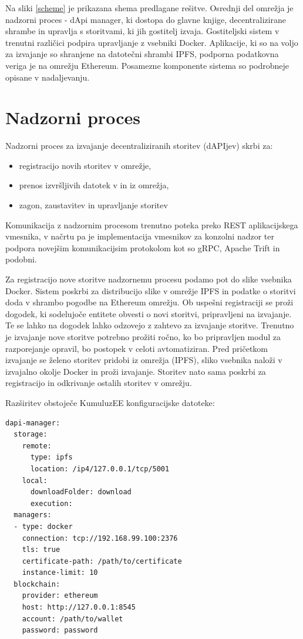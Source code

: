\documentclass[a4paper, 12pt]{book}
\begin{document}
Na sliki \ref{scheme} je prikazana shema predlagane rešitve. Osrednji del omrežja je nadzorni proces - 
dApi manager, ki dostopa do glavne knjige, decentralizirane shrambe in upravlja s storitvami, ki jih gostitelj izvaja.
Gostiteljski sistem v trenutni različici podpira upravljanje z vsebniki Docker.
Aplikacije, ki so na voljo za izvajanje so shranjene na datotečni shrambi IPFS, podporna podatkovna veriga je na omrežju Ethereum. Posamezne komponente sistema so podrobneje opisane v nadaljevanju.

\section{Nadzorni proces}
Nadzorni proces za izvajanje decentraliziranih storitev (dAPIjev) skrbi za:
\begin{itemize}
	\item registracijo novih storitev v omrežje, 
	\item prenos izvršljivih datotek v in iz omrežja,
	\item zagon, zaustavitev in upravljanje storitev
\end{itemize}

Komunikacija z nadzornim procesom trenutno poteka preko REST aplikacijskega vmesnika, v načrtu pa je implementacija vmesnikov za konzolni nadzor ter podpora novejšim komunikacijsim protokolom kot so gRPC, Apache Trift in podobni.

Za registracijo nove storitve nadzornemu procesu podamo pot do slike vsebnika Docker.
Sistem poskrbi za distribucijo slike v omrežje IPFS in podatke o storitvi doda v shrambo pogodbe na Ethereum omrežju.
Ob uspešni registraciji se proži dogodek, ki sodelujoče entitete obvesti o novi storitvi, pripravljeni na izvajanje.
Te se lahko na dogodek lahko odzovejo z zahtevo za izvajanje storitve.
Trenutno je izvajanje nove storitve potrebno prožiti ročno, ko bo pripravljen modul za razporejanje opravil, bo postopek v celoti avtomatiziran.
Pred pričetkom izvajanje se želeno storitev pridobi iz omrežja (IPFS), sliko vsebnika naloži v izvajalno okolje Docker in proži izvajanje.
Storitev nato sama poskrbi za registracijo in odkrivanje ostalih storitev v omrežju.

Razširitev obstoječe KumuluzEE konfiguracijske datoteke:

\begin{lstlisting}
dapi-manager:
  storage:
    remote:
      type: ipfs
      location: /ip4/127.0.0.1/tcp/5001
    local:
      downloadFolder: download
      execution:
  managers:
  - type: docker
    connection: tcp://192.168.99.100:2376
    tls: true
    certificate-path: /path/to/certificate
    instance-limit: 10
  blockchain:
    provider: ethereum
    host: http://127.0.0.1:8545
    account: /path/to/wallet
    password: password
\end{lstlisting}
\end{document}
